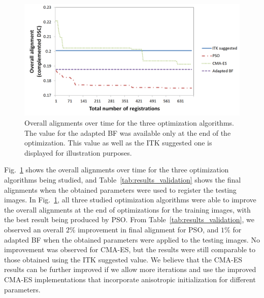 \documentclass[]{spie}  %
\begin{document}
\begin{figure}[!b]
\begin{center}
\includegraphics[width=6in]{results_training_2}
\end{center}
\caption{Overall alignments over time for the three optimization algorithms. The value for the adapted BF was available only at the end of the optimization. This value as well as the ITK suggested one is displayed for illustration purposes.}
\label{fig:results_training}
\end{figure}

Fig.~\ref{fig:results_training} shows the overall alignments over time for the three optimization algorithms being studied, and Table~\ref{tab:results_validation} shows the final alignments when the obtained parameters were used to register the testing images.
In Fig.~\ref{fig:results_training}, all three studied optimization algorithms were able to improve the overall alignments at the end of optimizations for the training images, with the best result being produced by PSO.
From Table~\ref{tab:results_validation}, we observed an overall $2\%$ improvement in final alignment for PSO, and $1\%$ for adapted BF when the obtained parameters were applied to the testing images. No improvement was observed for CMA-ES, but the results were still comparable to those obtained using the ITK suggested value. We believe that the CMA-ES results can be further improved if we allow more iterations and use the improved CMA-ES implementations that incorporate anisotropic initialization for different parameters.
\end{document}
